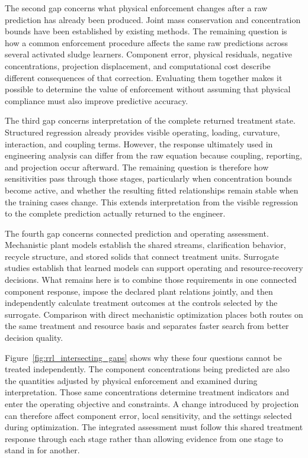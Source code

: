 The second gap concerns what physical enforcement changes after a raw prediction has already been produced. Joint mass conservation and concentration bounds have been established by existing methods. The remaining question is how a common enforcement procedure affects the same raw predictions across several activated sludge learners. Component error, physical residuals, negative concentrations, projection displacement, and computational cost describe different consequences of that correction. Evaluating them together makes it possible to determine the value of enforcement without assuming that physical compliance must also improve predictive accuracy.

The third gap concerns interpretation of the complete returned treatment state. Structured regression already provides visible operating, loading, curvature, interaction, and coupling terms. However, the response ultimately used in engineering analysis can differ from the raw equation because coupling, reporting, and projection occur afterward. The remaining question is therefore how sensitivities pass through those stages, particularly when concentration bounds become active, and whether the resulting fitted relationships remain stable when the training cases change. This extends interpretation from the visible regression to the complete prediction actually returned to the engineer.

The fourth gap concerns connected prediction and operating assessment. Mechanistic plant models establish the shared streams, clarification behavior, recycle structure, and stored solids that connect treatment units. Surrogate studies establish that learned models can support operating and resource-recovery decisions. What remains here is to combine those requirements in one connected component response, impose the declared plant relations jointly, and then independently calculate treatment outcomes at the controls selected by the surrogate. Comparison with direct mechanistic optimization places both routes on the same treatment and resource basis and separates faster search from better decision quality.

Figure~\ref{fig:rrl_intersecting_gaps} shows why these four questions cannot be treated independently. The component concentrations being predicted are also the quantities adjusted by physical enforcement and examined during interpretation. Those same concentrations determine treatment indicators and enter the operating objective and constraints. A change introduced by projection can therefore affect component error, local sensitivity, and the settings selected during optimization. The integrated assessment must follow this shared treatment response through each stage rather than allowing evidence from one stage to stand in for another.

